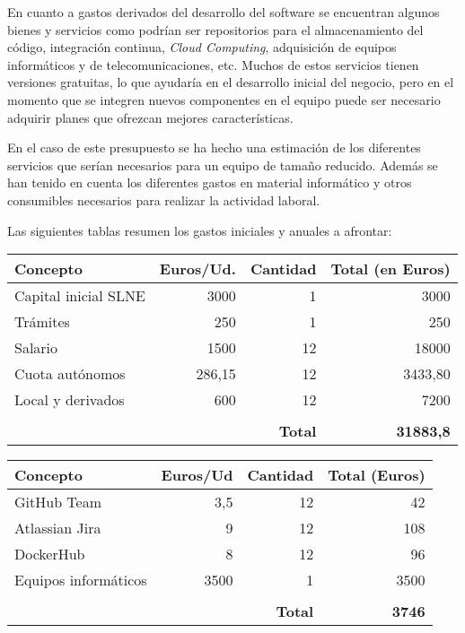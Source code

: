 En cuanto a gastos derivados del desarrollo del software se encuentran algunos bienes y servicios como podrían ser repositorios para el almacenamiento del código, integración continua, \textit{Cloud Computing}, adquisición de equipos informáticos y de telecomunicaciones, etc. Muchos de estos servicios tienen versiones gratuitas, lo que ayudaría en el desarrollo inicial del negocio, pero en el momento que se integren nuevos componentes en el equipo puede ser necesario adquirir planes que ofrezcan mejores características.

En el caso de este presupuesto se ha hecho una estimación de los diferentes servicios que serían necesarios para un equipo de tamaño reducido. Además se han tenido en cuenta los diferentes gastos en material informático y otros consumibles necesarios para realizar la actividad laboral.


\pagebreak
Las siguientes tablas resumen los gastos iniciales y anuales a afrontar:
\bigskip


\begin{table}[!h]
	\centering
	\begin{adjustbox}{width=1\textwidth}
	\begin{tabular}{|l|r|r|r|}
		\hline
		\textbf{Concepto} & \textbf{Euros/Ud.} & \textbf{Cantidad} & \textbf{Total (en Euros)} \\ \hline
		Capital inicial SLNE & 3000 & 1 & 3000 \\ \hline
		Trámites & 250 & 1 & 250 \\ \hline
		Salario & 1500 & 12 & 18000 \\ \hline
		Cuota autónomos & 286,15 & 12 & 3433,80 \\ \hline
		Local y derivados & 600 & 12 & 7200 \\ \hline
		&  &  &  \\
		&  & \textbf{Total} & \textbf{31883,8} \\ \hline
	\end{tabular}
	\end{adjustbox}
\end{table}


\begin{table}[!h]
	\centering
	\begin{adjustbox}{width=1\textwidth}
		\begin{tabular}{|l|r|r|r|}
			\hline
			\textbf{Concepto} & \textbf{Euros/Ud} & \textbf{Cantidad} & \textbf{Total (Euros)} \\ \hline
			GitHub Team & 3,5 & 12 & 42 \\ \hline
			Atlassian Jira & 9 & 12 & 108 \\ \hline
			DockerHub & 8 & 12 & 96 \\ \hline
			Equipos informáticos & 3500 & 1 & 3500 \\ \hline
			&  &  &  \\
			&  & \textbf{Total} & \textbf{3746} \\ \hline
		\end{tabular}
	\end{adjustbox}
\end{table}

